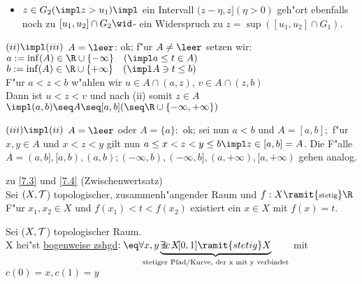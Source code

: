 \begin{satz}
{\begin{itemize}
\item $z\in G_2 (\impl z>u_1)\impl$ ein Intervall $(z-\eta ,z ] (\eta >0)$ geh"ort ebenfalls noch zu $[u_1,u_2]\cap G_2 \wid$- ein Widerspruch zu $z=\sup ([u_1,u_2]\cap G_1)$.
\end{itemize}
\item[$(ii)\impl (iii)$] $A=\leer $: ok; f"ur $A\neq\leer$ setzen wir:\\
$a:=\inf (A) \in \R\cup\{ -\infty\}\quad (\impl a\leq t\in A)$\\
$b:=\inf (A) \in \R\cup\{ +\infty\}\quad (\impl A\ni t\leq b)$\\
F"ur $a<z<b$ w"ahlen wir  $u\in A\cap (a,z)$, $v\in A\cap (z,b)$\\
Dann ist $u<z<v$ und nach (ii) somit $z\in A$\\
$\impl (a,b)\seq A\seq [a,b] (\seq \R\cup\{ -\infty ,+\infty\} )$
\item[$(iii)\impl (ii)$] $A=\leer$ oder $A=\{ a\}:$ ok; sei nun $a<b$ und $A=[a,b];$ f"ur $x,y\in A$ und $x<z<y$ gilt nun $a\leq x<z<y\leq b\impl z\in [a,b]=A$. Die F"alle $A= (a,b], [a,b), (a,b); (-\infty ,b), (-\infty ,b], (a,+\infty ), [a, +\infty )$ gehen analog.}
\end{satz}

\begin{kor}\label{7.5} zu \ref{7.3} und \ref{7.4} ({\sc Zwischenwertsatz})\\
Sei $(X,\mathcal T$) topologischer, zusammenh"angender Raum und $f:X\ramit{\mbox{\scriptsize stetig}}\R$\\
F"ur $x_1, x_2\in X$ und $f(x_1)<t<f(x_2)$ existiert ein $x\in X$ mit $f(x) = t$.
\end{kor}

\begin{definition}\label{7.6}
Sei ($X,\mathcal T$) topologischer Raum.\\
X hei"st \ul{bogenweise zshgd}$:\eq\forall x,y\in X\hspace*{-1.4cm}\underbrace{\exists c:[0,1]\ramit{stetig} X}_{\mbox{\scriptsize stetiger Pfad/Kurve, der x mit y verbindet}}$\hspace*{-1.4cm} mit $c(0)=x, c(1)=y$
\end{definition}

